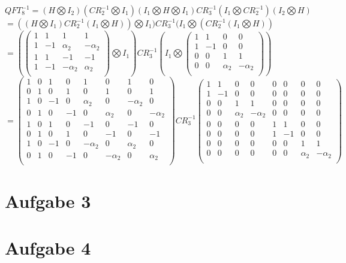 \documentclass[a4paper]{scrartcl}
\begin{document}
\begin{enumerate}[a)]
$QFT_8^{-1}=(H\bigotimes I_2)(CR_2^{-1}\bigotimes I_1)(I_1\bigotimes H \bigotimes I_1)CR_3^{-1}(I_1 \bigotimes CR_2^{-1})(I_2 \bigotimes H)$\\
$=((H\bigotimes I_1)CR_2^{-1}(I_1\bigotimes H)) \bigotimes I_1)CR_3^{-1}(I_1 \bigotimes (CR_2^{-1}(I_1 \bigotimes H))$\\
$=(\begin{pmatrix} 1&1&1&1\\ 1&-1&\alpha_2&-\alpha_2\\ 1&1&-1&-1\\ 1&-1&-\alpha_2&\alpha_2\\\end{pmatrix} \bigotimes I_1) CR_3^{-1}(I_1 \bigotimes \begin{pmatrix}1&1&0&0\\ 1&-1&0&0\\ 0&0&1&1\\ 0&0&\alpha_2&-\alpha_2\\ \end{pmatrix})$\\
$=\begin{pmatrix}
1&0&1&0&1&0&1&0\\
0&1&0&1&0&1&0&1\\
1&0&-1&0&\alpha_2&0&-\alpha_2&0\\
0&1&0&-1&0&\alpha_2&0&-\alpha_2\\
1&0&1&0&-1&0&-1&0\\
0&1&0&1&0&-1&0&-1\\
1&0&-1&0&-\alpha_2&0&\alpha_2&0\\
0&1&0&-1&0&-\alpha_2&0&\alpha_2\\
\end{pmatrix}
CR_3^{-1}
\begin{pmatrix}
1&1&0&0&0&0&0&0\\
1&-1&0&0&0&0&0&0\\
0&0&1&1&0&0&0&0\\
0&0&\alpha_2&-\alpha_2&0&0&0&0\\
0&0&0&0&1&1&0&0\\
0&0&0&0&1&-1&0&0\\
0&0&0&0&0&0&1&1\\
0&0&0&0&0&0&\alpha_2&-\alpha_2\\
\end{pmatrix}$\\

\end{enumerate}

\newpage
\section*{Aufgabe 3}

\newpage
\section*{Aufgabe 4}
\end{document}
